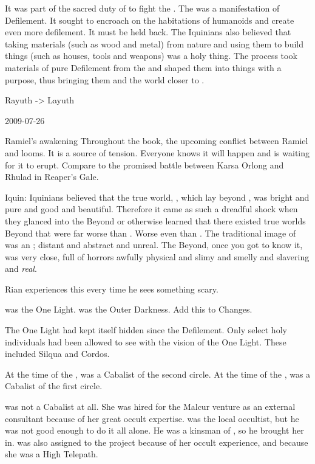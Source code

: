   It was part of the sacred duty of \tikkun to fight the \wylde.
  The \wylde was a manifestation of Defilement.
  It sought to encroach on the habitations of humanoids and create even more defilement.
  It must be held back. 
  The Iquinians also believed that taking materials (such as wood and metal) from nature and using them to build things (such as houses, tools and weapons) was a holy thing. 
  The process took materials of pure Defilement from the \wylde and shaped them into things with a purpose, thus bringing them and the world closer to \iquin. 


Rayuth -> Layuth



2009-07-26

Ramiel's awakening
Throughout the book, the upcoming conflict between Ramiel and \Dasteron looms. 
It is a source of tension. 
Everyone knows it will happen and is waiting for it to erupt. 
Compare to the promised battle between Karsa Orlong and Rhulad in Reaper's Gale. 


Iquin:
  Iquinians believed that the true world, \Atziluth, which lay beyond \Gehinnom, was bright and pure and good and beautiful. 
  Therefore it came as such a dreadful shock when they glanced into the Beyond or otherwise learned that there existed true worlds Beyond that were far worse than \Gehinnom. 
  Worse even than \itzach.
  The traditional image of \itzach was an ; distant and abstract and unreal. 
  The Beyond, once you got to know it, was very close, full of horrors awfully physical and slimy and smelly and slavering and \emph{real}. 
  
  Rian experiences this every time he sees something scary. 


\Iquin was the One Light. 
\Itzach was the Outer Darkness. 
Add this to Changes.


The One Light had kept itself hidden since the Defilement. 
Only select holy individuals had been allowed to see with the vision of the One Light.
These included Silqua and Cordos. 


At the time of the \thirdbanewar, \Cishiel was a Cabalist of the second circle. 
At the time of the \thirdbanewar, \Dasteron was a Cabalist of the first circle. 


\Urizeth was not a Cabalist at all. 
She was hired for the Malcur venture as an external consultant because of her great occult expertise. 
\Ganethed was the local occultist, but he was not good enough to do it all alone. 
He was a kinsman of \Urizeth, so he brought her in. 
\Achsah was also assigned to the project because of her occult experience, and because she was a High Telepath. 


